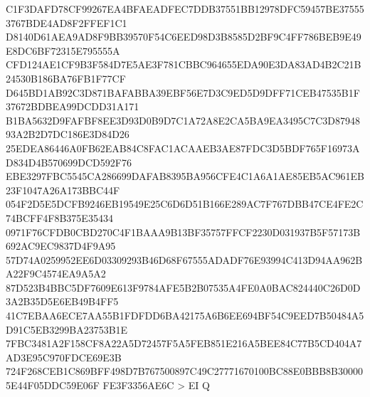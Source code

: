 {{C1F3DAFD78CF99267EA4BFAEADFEC7DDB37551BB12978DFC59457BE375553767BDE4AD8F2FFEF1C1
D8140D61AEA9AD8F9BB39570F54C6EED98D3B8585D2BF9C4FF786BEB9E49E8DC6BF72315E795555A
CFD124AE1CF9B3F584D7E5AE3F781CBBC964655EDA90E3DA83AD4B2C21B24530B186BA76FB1F77CF
D645BD1AB92C3D871BAFABBA39EBF56E7D3C9ED5D9DFF71CEB47535B1F37672BDBEA99DCDD31A171
B1BA5632D9FAFBF8EE3D93D0B9D7C1A72A8E2CA5BA9EA3495C7C3D8794893A2B2D7DC186E3D84D26
25EDEA86446A0FB62EAB84C8FAC1ACAAEB3AE87FDC3D5BDF765F16973AD834D4B570699DCD592F76
EBE3297FBC5545CA286699DAFAB8395BA956CFE4C1A6A1AE85EB5AC961EB23F1047A26A173BBC44F
054F2D5E5DCFB9246EB19549E25C6D6D51B166E289AC7F767DBB47CE4FE2C74BCFF4F8B375E35434
0971F76CFDB0CBD270C4F1BAAA9B13BF35757FFCF2230D031937B5F57173B692AC9EC9837D4F9A95
57D74A0259952EE6D03309293B46D68F67555ADADF76E93994C413D94AA962BA22F9C4574EA9A5A2
87D523B4BBC5DF7609E613F9784AFE5B2B07535A4FE0A0BAC824440C26D0D3A2B35D5E6EB49B4FF5
41C7EBAA6ECE7AA55B1FDFDD6BA42175A6B6EE694BF54C9EED7B50484A5D91C5EB3299BA23753B1E
7FBC3481A2F158CF8A22A5D72457F5A5FEB851E216A5BEE84C77B5CD404A7AD3E95C970FDCE69E3B
724F268CEB1C869BFF498D7B767500897C49C27771670100BC88E0BBB8B300005E44F05DDC59E06F
FE3F3356AE6C
>
EI %
Q  %
}}%
